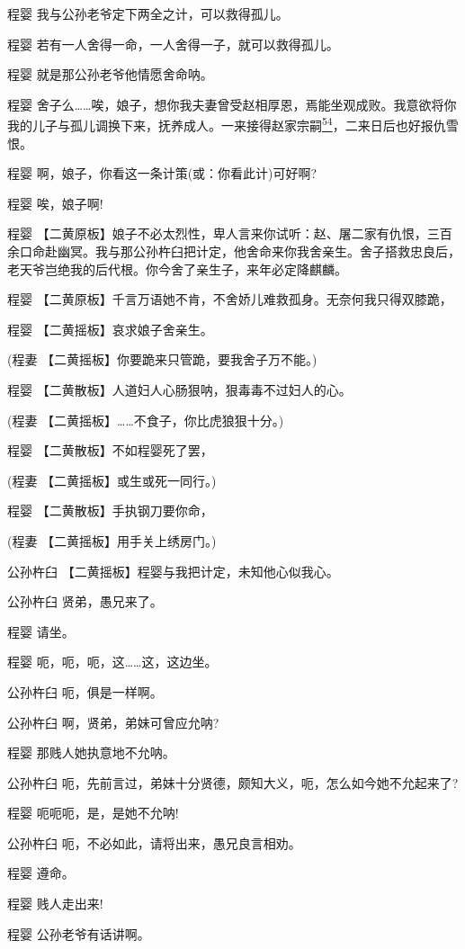 程婴 我与公孙老爷定下两全之计，可以救得孤儿。

程婴 若有一人舍得一命，一人舍得一子，就可以救得孤儿。

程婴 就是那公孙老爷他情愿舍命呐。

程婴
舍子么\ldots{}\ldots{}唉，娘子，想你我夫妻曾受赵相厚恩，焉能坐观成败。我意欲将你我的儿子与孤儿调换下来，抚养成人。一来接得赵家宗嗣\protect\hyperlink{fn54}{\textsuperscript{54}}，二来日后也好报仇雪恨。

程婴 啊，娘子，你看这一条计策(或：你看此计)可好啊?

程婴 唉，娘子啊!

程婴
【二黄原板】娘子不必太烈性，卑人言来你试听：赵、屠二家有仇恨，三百余口命赴幽冥。我与那公孙杵臼把计定，他舍命来你我舍亲生。舍子搭救忠良后，老天爷岂绝我的后代根。你今舍了亲生子，来年必定降麒麟。

程婴 【二黄原板】千言万语她不肯，不舍娇儿难救孤身。无奈何我只得双膝跪，

程婴 【二黄摇板】哀求娘子舍亲生。

(程妻 【二黄摇板】你要跪来只管跪，要我舍子万不能。)

程婴 【二黄散板】人道妇人心肠狠呐，狠毒毒不过妇人的心。

(程妻 【二黄摇板】\ldots{}\ldots{}不食子，你比虎狼狠十分。)

程婴 【二黄散板】不如程婴死了罢，

(程妻 【二黄摇板】或生或死一同行。)

程婴 【二黄散板】手执钢刀要你命，

(程妻 【二黄摇板】用手关上绣房门。)

公孙杵臼 【二黄摇板】程婴与我把计定，未知他心似我心。

公孙杵臼 贤弟，愚兄来了。

程婴 请坐。

程婴 呃，呃，呃，这\ldots{}\ldots{}这，这边坐。

公孙杵臼 呃，俱是一样啊。

公孙杵臼 啊，贤弟，弟妹可曾应允呐?

程婴 那贱人她执意地不允呐。

公孙杵臼 呃，先前言过，弟妹十分贤德，颇知大义，呃，怎么如今她不允起来了?

程婴 呃呃呃，是，是她不允呐!

公孙杵臼 呃，不必如此，请将出来，愚兄良言相劝。

程婴 遵命。

程婴 贱人走出来!

程婴 公孙老爷有话讲啊。

